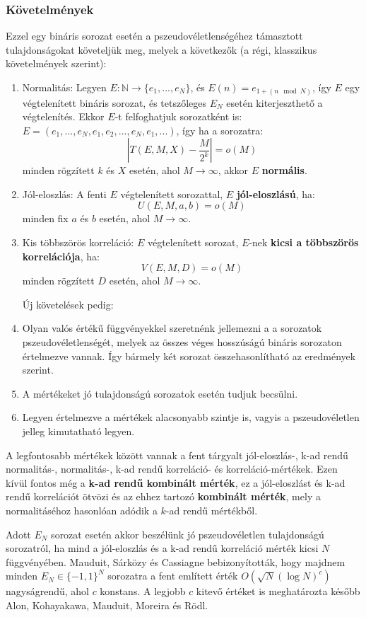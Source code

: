 \documentclass[hidelinks, 12pt]{article}
\begin{document}
	\subsubsection*{Követelmények}
	Ezzel egy bináris sorozat esetén a pszeudovéletlenségéhez támasztott tulajdonságokat követeljük meg, melyek a következők (a régi, klasszikus követelmények szerint):
	\begin{enumerate}
		\bfseries \item Normalitás:
		\normalfont	Legyen $E: \mathbb{N} \to \{e_1, ..., e_N\}$, és $E(n) = e_{1+(n \mod N)}$, így $E$ egy végtelenített bináris sorozat, és tetszőleges $E_N$ esetén kiterjeszthető a végtelenítés. Ekkor $E$-t felfoghatjuk sorozatként is: $E=(e_1, ..., e_N, e_1, e_2, ..., e_N, e_1, ...)$, így ha a sorozatra:
		$$\left|T(E, M, X) - \frac{M}{2^k}\right| = o(M)$$
		minden rögzített $k$ és $X$ esetén, ahol $M \to \infty$, akkor $E$ \textbf{normális}.
		\par
		\bfseries \item Jól-eloszlás:
		\normalfont A fenti $E$ végtelenített sorozattal, $E$ \textbf{jól-eloszlású}, ha:
		$$U(E, M, a, b) = o (M)$$
		minden fix $a$ és $b$ esetén, ahol $M \to \infty$.
		\bfseries \item Kis többszörös korreláció:
		\normalfont $E$ végtelenített sorozat, $E$-nek \textbf{kicsi a többszörös korrelációja}, ha:
		$$V(E, M, D) = o(M)$$
		minden rögzített $D$ esetén, ahol $M \to \infty$. \par
		Új követelések pedig:
		\item Olyan valós értékű függvényekkel szeretnénk jellemezni a a sorozatok pszeudovéletlenségét, melyek az összes véges hosszúságú bináris sorozaton értelmezve vannak. Így bármely két sorozat összehasonlítható az eredmények szerint.
		\item A mértékeket jó tulajdonságú sorozatok esetén tudjuk becsülni.
		\item Legyen értelmezve a mértékek alacsonyabb szintje is, vagyis a pszeudovéletlen jelleg kimutatható legyen. 
	\end{enumerate}
	A legfontosabb mértékek között vannak a fent tárgyalt jól-eloszlás-, k-ad rendű normalitás-, normalitás-, k-ad rendű korreláció- és korreláció-mértékek. Ezen kívül fontos még a \textbf{k-ad rendű kombinált mérték}, ez a jól-eloszlást és k-ad rendű korrelációt ötvözi és az ehhez tartozó \textbf{kombinált mérték}, mely a normalitáséhoz hasonlóan adódik a $k$-ad rendű mértékből.
	
	Adott $E_N$ sorozat esetén akkor beszélünk jó pszeudovéletlen tulajdonságú sorozatról, ha mind a jól-eloszlás és a k-ad rendű korreláció mérték kicsi $N$ függvényében. Mauduit, Sárközy és Cassiagne bebizonyították, hogy majdnem minden $E_N \in \{-1, 1\}^N$ sorozatra a fent említett érték $O(\sqrt{N}(\log{N})^c)$ nagyságrendű, ahol $c$ konstans. A legjobb $c$ kitevő értéket is meghatározta később Alon, Kohayakawa, Mauduit, Moreira és Rödl. \cite{cvalue} 
\end{document}
